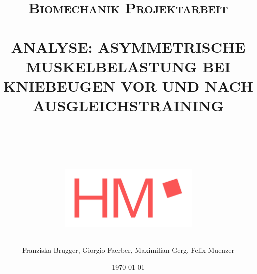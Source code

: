 

\fancyfoot[C]{\thepage}
\setlength {\marginparwidth }{2cm}


\begin{titlepage}
   \title{ \normalsize \textsc{Biomechanik Projektarbeit}
         \\ [1.0cm]
         \HRule{0.1pt} \\
         \LARGE \textbf{
             \uppercase{Analyse: asymmetrische  Muskelbelastung bei Kniebeugen vor und nach Ausgleichstraining\\}\\
         }
         \HRule{2pt} \\ [0.5cm]
         \begin{figure}[h!]
               \centering
               \includegraphics[width=0.6\textwidth]{img/Logo_hm.jpg}
           \end{figure}
           }

   \date{\today}

   \author{
           Franziska Brugger,
           Giorgio Faerber,
           Maximilian Gerg,
           Felix Muenzer
           }


   \end{titlepage}
   \maketitle
   \tableofcontents %
   \newpage
   \setcounter{page}{1}
   \listoffigures
   \listoftables
   \newpage

